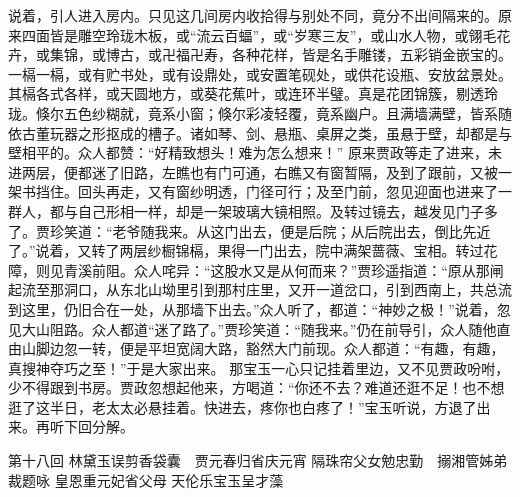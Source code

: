 \documentclass[12pt,oneside]{book}
\begin{document}
说着，引人进入房内。只见这几间房内收拾得与别处不同，竟分不出间隔来的。原来四面皆是雕空玲珑木板，或“流云百蝠”，或“岁寒三友”，或山水人物，或翎毛花卉，或集锦，或博古，或卍福卍寿，各种花样，皆是名手雕镂，五彩销金嵌宝的。一槅一槅，或有贮书处，或有设鼎处，或安置笔砚处，或供花设瓶、安放盆景处。其槅各式各样，或天圆地方，或葵花蕉叶，或连环半璧。真是花团锦簇，剔透玲珑。倏尔五色纱糊就，竟系小窗；倏尔彩凌轻覆，竟系幽户。且满墙满壁，皆系随依古董玩器之形抠成的槽子。诸如琴、剑、悬瓶、桌屏之类，虽悬于壁，却都是与壁相平的。众人都赞：“好精致想头！难为怎么想来！”
原来贾政等走了进来，未进两层，便都迷了旧路，左瞧也有门可通，右瞧又有窗暂隔，及到了跟前，又被一架书挡住。回头再走，又有窗纱明透，门径可行；及至门前，忽见迎面也进来了一群人，都与自己形相一样，却是一架玻璃大镜相照。及转过镜去，越发见门子多了。贾珍笑道：“老爷随我来。从这门出去，便是后院；从后院出去，倒比先近了。”说着，又转了两层纱橱锦槅，果得一门出去，院中满架蔷薇、宝相。转过花障，则见青溪前阻。众人咤异：“这股水又是从何而来？”贾珍遥指道：“原从那闸起流至那洞口，从东北山坳里引到那村庄里，又开一道岔口，引到西南上，共总流到这里，仍旧合在一处，从那墙下出去。”众人听了，都道：“神妙之极！”说着，忽见大山阻路。众人都道“迷了路了。”贾珍笑道：“随我来。”仍在前导引，众人随他直由山脚边忽一转，便是平坦宽阔大路，豁然大门前现。众人都道：“有趣，有趣，真搜神夺巧之至！”于是大家出来。
那宝玉一心只记挂着里边，又不见贾政吩咐，少不得跟到书房。贾政忽想起他来，方喝道：“你还不去？难道还逛不足！也不想逛了这半日，老太太必悬挂着。快进去，疼你也白疼了！”宝玉听说，方退了出来。再听下回分解。




 
第十八回  林黛玉误剪香袋囊　贾元春归省庆元宵
          隔珠帘父女勉忠勤　搦湘管姊弟裁题咏
          皇恩重元妃省父母  天伦乐宝玉呈才藻
\end{document}
